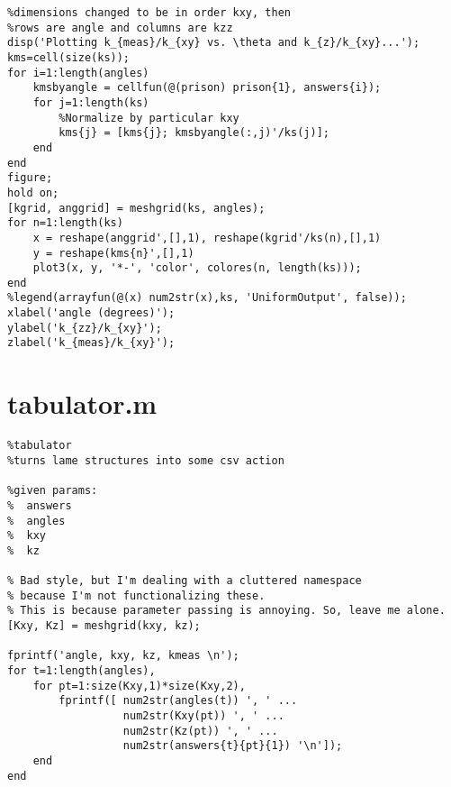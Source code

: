 \begin{verbatim}
%dimensions changed to be in order kxy, then
%rows are angle and columns are kzz
disp('Plotting k_{meas}/k_{xy} vs. \theta and k_{z}/k_{xy}...');
kms=cell(size(ks));
for i=1:length(angles)
    kmsbyangle = cellfun(@(prison) prison{1}, answers{i});
    for j=1:length(ks)
        %Normalize by particular kxy
        kms{j} = [kms{j}; kmsbyangle(:,j)'/ks(j)];
    end
end
figure;
hold on;
[kgrid, anggrid] = meshgrid(ks, angles);
for n=1:length(ks)
    x = reshape(anggrid',[],1), reshape(kgrid'/ks(n),[],1)
    y = reshape(kms{n}',[],1)
    plot3(x, y, '*-', 'color', colores(n, length(ks)));
end
%legend(arrayfun(@(x) num2str(x),ks, 'UniformOutput', false));
xlabel('angle (degrees)');
ylabel('k_{zz}/k_{xy}');
zlabel('k_{meas}/k_{xy}');
\end{verbatim}
\normalsize

\section{tabulator.m}
\small
\begin{verbatim}
%tabulator
%turns lame structures into some csv action

%given params:
%  answers
%  angles
%  kxy
%  kz

% Bad style, but I'm dealing with a cluttered namespace
% because I'm not functionalizing these.
% This is because parameter passing is annoying. So, leave me alone.
[Kxy, Kz] = meshgrid(kxy, kz);

fprintf('angle, kxy, kz, kmeas \n');
for t=1:length(angles),
    for pt=1:size(Kxy,1)*size(Kxy,2),
        fprintf([ num2str(angles(t)) ', ' ...
                  num2str(Kxy(pt)) ', ' ...
                  num2str(Kz(pt)) ', ' ...
                  num2str(answers{t}{pt}{1}) '\n']);
    end
end
\end{verbatim}
\normalsize

